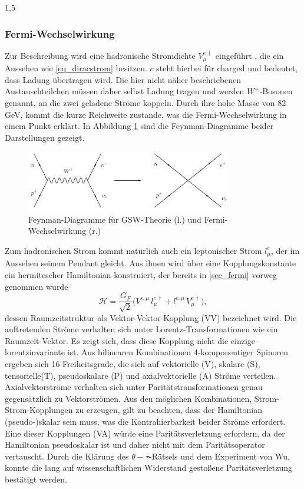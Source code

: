 \documentclass[11pt,a4paper,twoside]{report}
\begin{document}
\begin{spacing}{1,5}
\subsubsection{Fermi-Wechselwirkung}
\label{sec_fermiWW}
Zur Beschreibung wird eine hadronische Stromdichte $V_\mu^{c\,\dagger}$ eingeführt \cite{Klapdor}, die ein Aussehen wie \eqref{eq_diracstrom} besitzen. 
$c$ steht hierbei für charged und bedeutet, dass Ladung
übertragen wird. Die hier nicht näher beschriebenen Austauschteilchen müssen daher selbst Ladung tragen und werden $W^\pm$-Bosonen genannt, an die zwei 
geladene Ströme koppeln. Durch ihre hohe Masse von 82 GeV, kommt die kurze Reichweite zustande, was die Fermi-Wechselwirkung in einem Punkt erklärt. In
Abbildung \ref{pic_4fermi} sind die Feynman-Diagramme beider Darstellungen gezeigt.
\begin{figure}[H]
\includegraphics[width=0.8\textwidth]{Abbildungen/4fermi.jpg}
\caption{Feynman-Diagramme für GSW-Theorie (l.) und Fermi-Wechselwirkung (r.)}
\label{pic_4fermi}
\end{figure}
Zum hadronischen Strom kommt natürlich auch ein leptonischer Strom $l_\mu^c$, der im Aussehen seinem Pendant gleicht. Aus ihnen wird über eine Kopplungskonstante
ein hermitescher Hamiltonian konstruiert, der bereits in \ref{sec_fermi} vorweg genommen wurde
\begin{equation}
 \mathcal{H} = \frac{G_F}{\sqrt{2}}\big(V^{c,\mu}\,l_\mu^{c\,\dagger} + l^{c,\mu}\,V_\mu^{c\,\dagger}\big),
\end{equation}
dessen Raumzeitstruktur als Vektor-Vektor-Kopplung (VV) bezeichnet wird. Die auftretenden Ströme verhalten sich unter Lorentz-Transformationen wie ein Raumzeit-Vektor.
Es zeigt sich, dass diese Kopplung nicht die einzige lorentzinvariante ist. Aus bilinearen Kombinationen 4-komponentiger Spinoren ergeben sich 16 Freiheitsgrade,
die sich auf vektorielle (V), skalare (S), tensorielle(T), pseudoskalare (P) und axialvektorielle (A) Ströme verteilen. Axialvektorströme verhalten sich unter
Paritätstransformationen genau gegensätzlich zu Vektorströmen. Aus den möglichen Kombinationen, Strom-Strom-Kopplungen zu erzeugen, gilt zu beachten, dass
der Hamiltonian (pseudo-)skalar sein muss, was die Kontrahierbarkeit beider Ströme erfordert. Eine dieser Kopplungen (VA) würde eine Paritätsverletzung erfordern,
da der Hamiltonian pseudoskalar ist und daher nicht mit dem Paritätsoperator vertauscht. Durch die Klärung des $\theta-\tau$-Rätsels und dem Experiment von Wu,
konnte die lang auf wissenschaftlichen Widerstand gestoßene Paritätsverletzung bestätigt werden.


\end{spacing}
\end{document}
